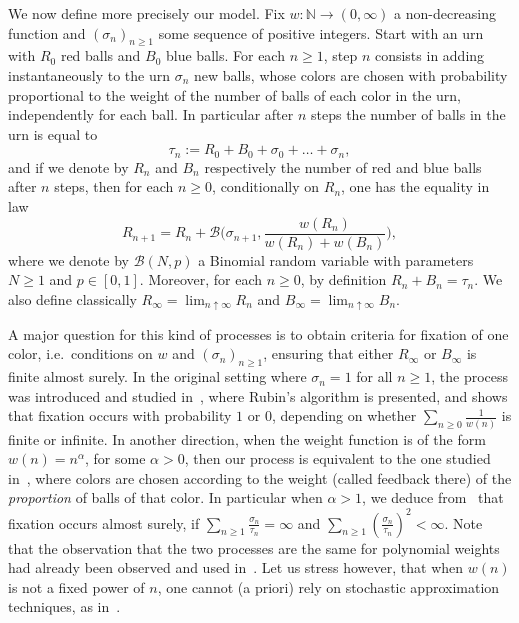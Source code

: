 \documentclass[11pt]{article}
\newcommand{\1}{{\text{\Large $\mathfrak 1$}}}
\begin{document}
\vspace{0,2cm}
We now define more precisely our model. Fix $w:\mathbb N \to (0,\infty)$ a non-decreasing function and $(\sigma_n)_{n\ge 1}$ some sequence of positive integers. 
Start with an urn with $R_0$ red balls and $B_0$ blue balls.  
For each $n\ge 1$, step $n$ consists in adding instantaneously to the urn $\sigma_n$ new balls, whose colors are chosen with probability proportional to the weight of the number of balls of each color 
in the urn, independently for each ball.  
In particular after $n$ steps the number of balls in the urn is equal to
$$\tau_n := R_0 + B_0 + \sigma_0+\dots + \sigma_n,$$ 
and if we denote by $R_n$ and $B_n$ respectively the number of red and blue balls after $n$ steps, then for each $n\ge 0$, conditionally on $R_n$, one has the equality in law
$$R_{n+1} = R_n + \mathcal B\Big( \sigma_{n+1}, \frac{w(R_n)}{w(R_n) + w(B_n)}\Big),$$
where we denote by $\mathcal B(N,p)$ a Binomial random variable with parameters $N\ge 1$ and $p\in [0,1]$. Moreover, for each $n\ge 0$, by definition $R_n + B_n = \tau_n$. 
We also define classically $R_\infty =\lim_{n\uparrow \infty} R_n$ and $B_\infty = \lim_{n\uparrow \infty} B_n$. 

\vspace{0.2cm}
A major question for this kind of processes is to obtain criteria for fixation of one color, i.e.~conditions on $w$ and $(\sigma_n)_{n\ge 1}$, ensuring that either $R_\infty$ or $B_\infty$ is finite almost surely. 
In the original setting where $\sigma_n = 1$ for all $n\ge 1$, 
the process was introduced and studied in~\cite{Dav}, where Rubin's algorithm is presented, and shows that fixation occurs with probability $1$ or $0$, depending on whether 
$\sum_{n\ge 0} \frac 1{w(n)}$ is finite 
or infinite. In another direction, when the weight function is of the form $w(n) = n^\alpha$, for some $\alpha>0$, then our 
process is equivalent to the one studied in~\cite{RT24}, where colors are chosen according to the weight (called feedback there) of the {\it proportion} of balls of that color. In particular when $\alpha>1$, we deduce from~\cite{RT24} that fixation occurs almost surely, if $\sum_{n\ge 1} \frac{\sigma_n}{\tau_n} = \infty$ and 
$\sum_{n\ge 1} (\frac{\sigma_n}{\tau_n})^2 <\infty$. Note that the observation that the two processes are the same for polynomial weights had already been observed and used in~\cite{BRS}. 
Let us stress however, that when $w(n)$ is not a fixed power of $n$, one cannot (a priori) rely on stochastic approximation techniques, as in~\cite{RT24}. 
\end{document}
